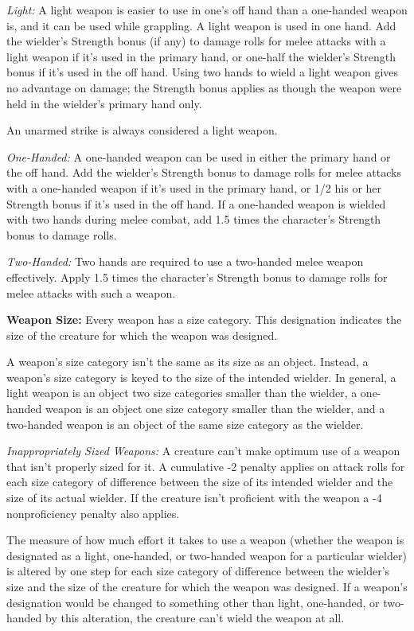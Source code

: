 \textit{Light:} A light weapon is easier to use in one's off hand than a one-handed weapon is, and it can be used while grappling. A light weapon is used in one hand. Add the wielder's Strength bonus (if any) to damage rolls for melee attacks with a light weapon if it's used in the primary hand, or one-half the wielder's Strength bonus if it's used in the off hand. Using two hands to wield a light weapon gives no advantage on damage; the Strength bonus applies as though the weapon were held in the wielder's primary hand only.

An unarmed strike is always considered a light weapon.

\textit{One-Handed:} A one-handed weapon can be used in either the primary hand or the off hand. Add the wielder's Strength bonus to damage rolls for melee attacks with a one-handed weapon if it's used in the primary hand, or 1/2 his or her Strength bonus if it's used in the off hand. If a one-handed weapon is wielded with two hands during melee combat, add 1.5 times the character's Strength bonus to damage rolls.

\textit{Two-Handed:} Two hands are required to use a two-handed melee weapon effectively. Apply 1.5 times the character's Strength bonus to damage rolls for melee attacks with such a weapon. 

\vspace{12pt}
\textbf{Weapon Size:} Every weapon has a size category. This designation indicates the size of the creature for which the weapon was designed.

A weapon's size category isn't the same as its size as an object. Instead, a weapon's size category is keyed to the size of the intended wielder. In general, a light weapon is an object two size categories smaller than the wielder, a one-handed weapon is an object one size category smaller than the wielder, and a two-handed weapon is an object of the same size category as the wielder.

\textit{Inappropriately Sized Weapons:} A creature can't make optimum use of a weapon that isn't properly sized for it. A cumulative -2 penalty applies on attack rolls for each size category of difference between the size of its intended wielder and the size of its actual wielder. If the creature isn't proficient with the weapon a -4 nonproficiency penalty also applies.

The measure of how much effort it takes to use a weapon (whether the weapon is designated as a light, one-handed, or two-handed weapon for a particular wielder) is altered by one step for each size category of difference between the wielder's size and the size of the creature for which the weapon was designed. If a weapon's designation would be changed to something other than light, one-handed, or two-handed by this alteration, the creature can't wield the weapon at all.

